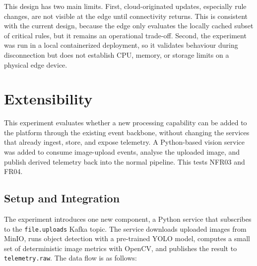 This design has two main limits. First, cloud-originated updates, especially rule changes, are not visible at the edge until connectivity returns. This is consistent with the current design, because the edge only evaluates the locally cached subset of critical rules, but it remains an operational trade-off. Second, the experiment was run in a local containerized deployment, so it validates behaviour during disconnection but does not establish CPU, memory, or storage limits on a physical edge device.


\section{Extensibility}
\label{sec:EvalExtensibility}

This experiment evaluates whether a new processing capability can be added to the platform through the existing event backbone, without changing the services that already ingest, store, and expose telemetry. A Python-based vision service was added to consume image-upload events, analyse the uploaded image, and publish derived telemetry back into the normal pipeline. This tests NFR03 and FR04.

\subsection{Setup and Integration}
\label{subsec:EvalExtensibilitySetup}

The experiment introduces one new component, a Python service that subscribes to the \texttt{file.uploads} Kafka topic. The service downloads uploaded images from MinIO, runs object detection with a pre-trained YOLO model, computes a small set of deterministic image metrics with OpenCV, and publishes the result to \texttt{telemetry.raw}. The data flow is as follows:

